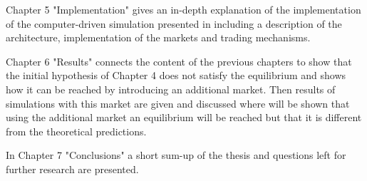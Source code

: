 \documentclass[Bachelorarbeit.tex]{subfiles}
\begin{document}
\bigskip

Chapter 5 "Implementation" gives an in-depth explanation of the implementation of the computer-driven simulation presented in \cite{Breuer2015} including a description of the architecture, implementation of the markets and trading mechanisms.

\bigskip

Chapter 6 "Results" connects the content of the previous chapters to show that the initial hypothesis of Chapter 4 does not satisfy the equilibrium and shows how it can be reached by introducing an additional market. Then results of simulations with this market are given and discussed where will be shown that using the additional market an equilibrium will be reached but that it is different from the theoretical predictions.

\bigskip

In Chapter 7 "Conclusions" a short sum-up of the thesis and questions left for further research are presented.
\end{document}
